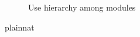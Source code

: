 \documentclass[12pt, titlepage]{article}
\begin{document}
\begin{figure}[H]
\centering
\caption{Use hierarchy among modules}
\label{FigUH}
\end{figure}


 {plainnat}


\newpage{}
\end{document}
